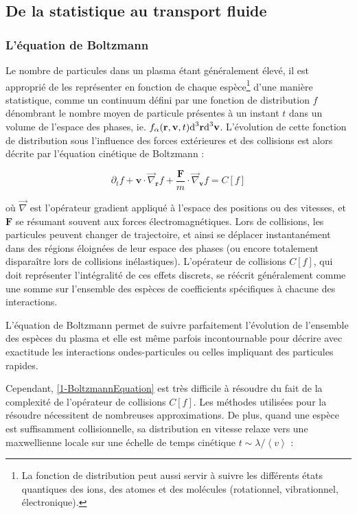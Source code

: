 \begin{refsection}
\subsection{De la statistique au transport fluide}

\subsubsection{L'équation de Boltzmann}
Le nombre de particules dans un plasma étant généralement élevé, il est
approprié de les représenter en fonction de chaque
espèce\footnote{La fonction de
distribution peut aussi servir à suivre les différents états quantiques des
ions, des atomes et des molécules (rotationnel, vibrationnel, électronique).}
d'une manière statistique, comme un continuum défini par une fonction de
distribution $f$ dénombrant le nombre moyen de particule présentes à un instant
$t$ dans un volume de l'espace des phases, ie. $f_\alpha(\mathbf r,\mathbf
v,t)\text{d}^{{3}}\mathbf r\text{d}^{{3}}\mathbf v$.
L'évolution de cette fonction de distribution sous l'influence des forces
extérieures et des collisions est alors décrite par l'équation cinétique de
Boltzmann :

\begin{equation}
\label{1-BoltzmannEquation}
\partial_tf+\mathbf{v}\cdot\vec\nabla_\mathbf{r}f+
\frac{\mathbf{F}}{m}\cdot\vec\nabla_{\mathbf{v}}f
=C[f]
\end{equation}

où $\vec\nabla$ est l'opérateur gradient appliqué à l'espace des positions ou
des vitesses, et $\mathbf{F}$ se résumant souvent aux forces
électromagnétiques. Lors de collisions, les particules peuvent changer de
trajectoire, et ainsi se déplacer instantanément dans des régions éloignées de leur espace des
phases (ou encore totalement disparaître lors de collisions inélastiques).
L'opérateur de collisions $C[f]$, qui doit représenter l'intégralité de
ces effets discrets, se réécrit généralement comme une somme sur l'ensemble des
espèces de coefficients spécifiques à chacune des interactions.

L'équation de Boltzmann permet de suivre
parfaitement l'évolution de l'ensemble des espèces du plasma et elle est
même parfois incontournable pour décrire avec exactitude les interactions
ondes-particules ou celles impliquant des particules rapides. 

Cependant, \eqref{1-BoltzmannEquation} est très
difficile à résoudre du fait de la complexité de l'opérateur de collisions
$C[f]$. Les méthodes utilisées pour la résoudre nécessitent de nombreuses
approximations\parencite{HagelaarHDR}. De plus, quand une espèce est
suffisamment collisionnelle, sa distribution en vitesse relaxe vers une maxwellienne locale sur une échelle de
temps cinétique $t\sim\lambda/\left<v\right>$ :


\end{refsection}
